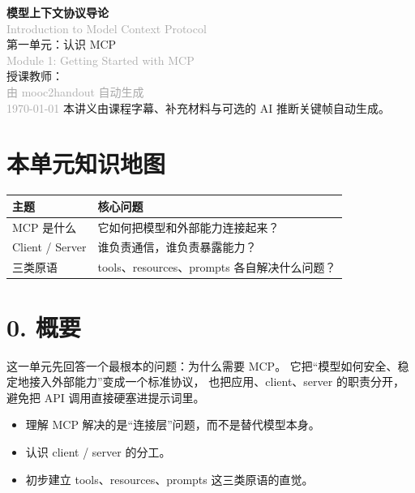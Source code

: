 \documentclass[UTF8,a4paper,11pt]{ctexart}
\begin{document}
\begin{center}
  \vspace*{2cm}
  {\Huge\bfseries\color{accent} 模型上下文协议导论}\\[0.3cm]
  {\small\textcolor{darkgray}{Introduction to Model Context Protocol}}\\[0.8cm]
  {\LARGE 第一单元：认识 MCP}\\[0.3cm]
  {\small\textcolor{darkgray}{Module 1: Getting Started with MCP}}\\[1.2cm]
  {\large 授课教师： }\\[0.5cm]
  {\large\textcolor{darkgray}{由 mooc2handout 自动生成}}\\[0.3cm]
  {\small\textcolor{darkgray}{\today}}
  \vfill
  {\small 本讲义由课程字幕、补充材料与可选的 AI 推断关键帧自动生成。}
\end{center}
\newpage

\tableofcontents
\newpage

\section*{本单元知识地图}
\begin{longtable}{p{3.1cm}p{10.2cm}}
\toprule
主题 & 核心问题 \\
\midrule
MCP 是什么 & 它如何把模型和外部能力连接起来？ \\
Client / Server & 谁负责通信，谁负责暴露能力？ \\
三类原语 & tools、resources、prompts 各自解决什么问题？ \\
\bottomrule
\end{longtable}

\section*{0. 概要}
这一单元先回答一个最根本的问题：为什么需要 MCP。
它把“模型如何安全、稳定地接入外部能力”变成一个标准协议，
也把应用、client、server 的职责分开，避免把 API 调用直接硬塞进提示词里。

\begin{itemize}
  \item 理解 MCP 解决的是“连接层”问题，而不是替代模型本身。
  \item 认识 client / server 的分工。
  \item 初步建立 tools、resources、prompts 这三类原语的直觉。
\end{itemize}
\end{document}
